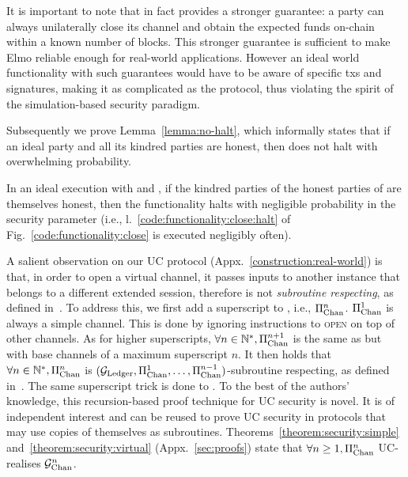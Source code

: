     It is important to note that in fact \pchan provides a stronger guarantee:
  a party can always unilaterally close its channel
  and obtain the expected funds on-chain within a known number of blocks.
  This stronger guarantee is sufficient to make Elmo reliable
  enough for real-world applications. However an ideal world
  functionality with such guarantees would have to be aware of specific
  txs and signatures, making it as complicated
  as the protocol, thus violating the spirit of the simulation-based security
  paradigm.

  Subsequently we prove Lemma~\ref{lemma:no-halt}, which informally states that
  if an ideal party and all its kindred parties are honest, then \fchan does not
  halt with overwhelming probability.

\begin{lemma}[No halt]
\label{lemma:no-halt}
  In an ideal execution with \fchan and \simulator, if the kindred parties of
  the honest parties of \fchan are themselves honest, then the functionality
  halts with negligible probability in the security parameter (i.e.,
  l.~\ref{code:functionality:close:halt} of Fig.~\ref{code:functionality:close}
  is executed negligibly often).
\end{lemma}

  A salient observation
  on our UC protocol \pchan (Appx.~\ref{construction:real-world}) is
  that, in order to
  open a virtual channel, it passes inputs to another \pchan instance that
  belongs to a different extended session, therefore \pchan is not
  \emph{subroutine respecting}, as defined in~\cite{uc}. To
  address this, we first add a superscript to \pchan, i.e.,
  $\Pi_{\mathrm{Chan}}^{n}$. $\Pi_{\mathrm{Chan}}^{1}$ is always a simple channel.
  This is done by ignoring instructions to \textsc{open} on top of other
  channels. As for higher superscripts, $\forall n \in
  \mathbb{N}^*, \Pi_{\mathrm{Chan}}^{n+1}$ is the same as \pchan but with
  base channels of a maximum superscript $n$. It then holds that $\forall
  n \in \mathbb{N}^*, \Pi_{\mathrm{Chan}}^{n}$ is $(\mathcal{G}_{\mathrm{Ledger}}, \Pi_{\mathrm{Chan}}^{1}, \dots,
  \Pi_{\mathrm{Chan}}^{n-1})$-subroutine respecting, as defined
  in~\cite{DBLP:conf/tcc/BadertscherCHTZ20}. The same superscript trick is done
  to \fchan. To
  the best of the authors' knowledge, this recursion-based proof technique for
  UC security is novel. It is of independent interest and can be reused to prove
  UC security in protocols that may use copies of themselves as subroutines.
  Theorems~\ref{theorem:security:simple} and~\ref{theorem:security:virtual}
  (Appx.~\ref{sec:proofs}) state
  that $\forall n \geq 1, \Pi_{\mathrm{Chan}}^{n}$ UC-realises $\mathcal{G}_{\mathrm{Chan}}^{n}$.
